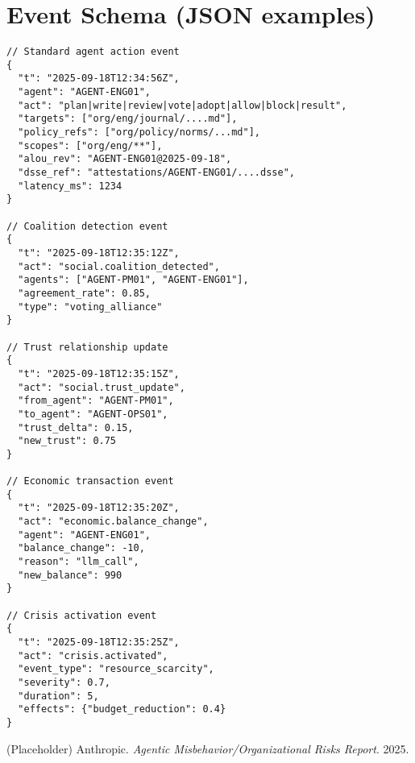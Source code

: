 \documentclass[11pt]{article}
\begin{document}
\section{Event Schema (JSON examples)}
\begin{verbatim}
// Standard agent action event
{
  "t": "2025-09-18T12:34:56Z",
  "agent": "AGENT-ENG01",
  "act": "plan|write|review|vote|adopt|allow|block|result",
  "targets": ["org/eng/journal/....md"],
  "policy_refs": ["org/policy/norms/...md"],
  "scopes": ["org/eng/**"],
  "alou_rev": "AGENT-ENG01@2025-09-18",
  "dsse_ref": "attestations/AGENT-ENG01/....dsse",
  "latency_ms": 1234
}

// Coalition detection event
{
  "t": "2025-09-18T12:35:12Z",
  "act": "social.coalition_detected",
  "agents": ["AGENT-PM01", "AGENT-ENG01"],
  "agreement_rate": 0.85,
  "type": "voting_alliance"
}

// Trust relationship update
{
  "t": "2025-09-18T12:35:15Z",
  "act": "social.trust_update",
  "from_agent": "AGENT-PM01",
  "to_agent": "AGENT-OPS01",
  "trust_delta": 0.15,
  "new_trust": 0.75
}

// Economic transaction event
{
  "t": "2025-09-18T12:35:20Z",
  "act": "economic.balance_change",
  "agent": "AGENT-ENG01",
  "balance_change": -10,
  "reason": "llm_call",
  "new_balance": 990
}

// Crisis activation event
{
  "t": "2025-09-18T12:35:25Z",
  "act": "crisis.activated",
  "event_type": "resource_scarcity",
  "severity": 0.7,
  "duration": 5,
  "effects": {"budget_reduction": 0.4}
}
\end{verbatim}

\begin{thebibliography}{9}
(Placeholder) Anthropic. \textit{Agentic Misbehavior/Organizational Risks Report}. 2025.
\end{thebibliography}
\end{document}
